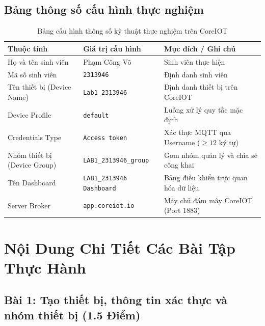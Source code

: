 \subsection{Bảng thông số cấu hình thực nghiệm}
\begin{table}[H]
\centering
\caption{Bảng cấu hình thông số kỹ thuật thực nghiệm trên CoreIOT}
\label{tab:iot_lab1_config}
\begin{tabularx}{\textwidth}{|p{4.5cm}|p{4.8cm}|X|}
\hline
\textbf{Thuộc tính} & \textbf{Giá trị cấu hình} & \textbf{Mục đích / Ghi chú} \\
\hline
Họ và tên sinh viên & Phạm Công Võ & Sinh viên thực hiện \\
Mã số sinh viên & \texttt{2313946} & Định danh sinh viên \\
Tên thiết bị (Device Name) & \texttt{Lab1\_2313946} & Định danh thiết bị trên CoreIOT \\
Device Profile & \texttt{default} & Luồng xử lý quy tắc mặc định \\
Credentials Type & \texttt{Access token} & Xác thực MQTT qua Username ($\ge 12$ ký tự) \\
Nhóm thiết bị (Device Group) & \texttt{LAB1\_2313946\_group} & Gom nhóm quản lý và chia sẻ công khai \\
Tên Dashboard & \texttt{LAB1\_2313946 Dashboard} & Bảng điều khiển trực quan hóa dữ liệu \\
Server Broker & \texttt{app.coreiot.io} & Máy chủ đám mây CoreIOT (Port 1883) \\
\hline
\end{tabularx}
\end{table}

\newpage
\section{Nội Dung Chi Tiết Các Bài Tập Thực Hành}

\subsection{Bài 1: Tạo thiết bị, thông tin xác thực và nhóm thiết bị (1.5 Điểm)}

